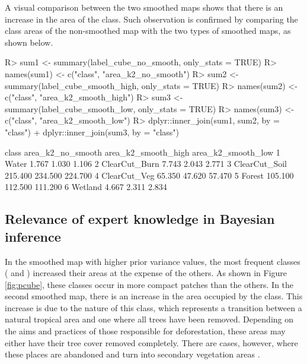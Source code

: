 \documentclass[
  shortnames]{jss}
\begin{document}
A visual comparison between the two smoothed maps shows that there is an increase in the area of the  class. Such observation is confirmed by comparing the class areas of the non-smoothed map with the two types of smoothed maps, as shown below.

\begin{CodeChunk}
\begin{CodeInput}
R> sum1 <- summary(label_cube_no_smooth, only_stats = TRUE)
R> names(sum1) <- c("class", "area_k2_no_smooth")
R> sum2 <- summary(label_cube_smooth_high, only_stats = TRUE)
R> names(sum2) <- c("class", "area_k2_smooth_high")
R> sum3 <- summary(label_cube_smooth_low, only_stats = TRUE)
R> names(sum3) <- c("class", "area_k2_smooth_low")
R> dplyr::inner_join(sum1, sum2, by = "class") %
+   dplyr::inner_join(sum3, by = "class")
\end{CodeInput}
\begin{CodeOutput}
          class area_k2_no_smooth area_k2_smooth_high area_k2_smooth_low
1         Water             1.767               1.030              1.106
2 ClearCut_Burn             7.743               2.043              2.771
3 ClearCut_Soil           215.400             234.500            224.700
4  ClearCut_Veg            65.350              47.620             57.470
5        Forest           105.100             112.500            111.200
6       Wetland             4.667               2.311              2.834
\end{CodeOutput}
\end{CodeChunk}

\hypertarget{relevance-of-expert-knowledge-in-bayesian-inference}{%
\subsection{Relevance of expert knowledge in Bayesian inference}\label{relevance-of-expert-knowledge-in-bayesian-inference}}

In the smoothed map with higher prior variance values, the most frequent classes ( and ) increased their areas at the expense of the others. As shown in Figure \ref{fig:pcube}, these classes occur in more compact patches than the others. In the second smoothed map, there is an increase in the area occupied by the  class. This increase is due to the nature of this class, which represents a transition between a natural tropical area and one where all trees have been removed. Depending on the aims and practices of those responsible for deforestation, these areas may either have their tree cover removed completely. There are cases, however, where these places are abandoned and turn into secondary vegetation areas \cite{Uhl1988, Wang2020}.
\end{document}
